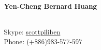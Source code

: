 \documentclass[letterpaper,11pt,oneside]{article}
\newcommand*{\Skype}{\href{skype:scottpiliben?add}{scottpiliben}}
\newcommand{\Absender}[1][\normalsize]{\Skype}
\begin{document}

\noindent  \LARGE{\textbf{Yen-Cheng Bernard Huang}}  \\
\vspace{-2ex}
\hline 
\normalsize


\begin{center}
\begin{tabular}
\href {Mail to : scottpiliben@gmail.com} \\
\hspace{1in} Skype: \Absender  \\
\hspace{1in} Phone: (+886)983-577-597 \\
\end{tabular}
\end{center}
\hline 
\vspace{1em}

\end{document}
